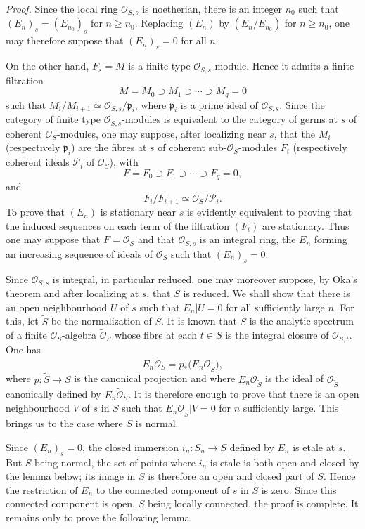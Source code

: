 \documentclass[11pt]{article}
\begin{document}
\emph{Proof.} Since the local ring $\mathcal O_{S,s}$ is noetherian, there is an integer $n_0$ such that $(E_n)_s=(E_{n_0})_s$ for $n\geq n_0$. Replacing $(E_n)$ by $(E_n/E_{n_0})$ for $n\geq n_0$, one may therefore suppose that $(E_n)_s=0$ for all $n$.

On the other hand, $F_s=M$ is a finite type $\mathcal O_{S,s}$-module. Hence it admits a finite filtration
\[
M=M_0\supset M_1\supset\cdots\supset M_q=0
\]
such that $M_i/M_{i+1}\simeq \mathcal O_{S,s}/\mathfrak p_i$, where $\mathfrak p_i$ is a prime ideal of $\mathcal O_{S,s}$. Since the category of finite type $\mathcal O_{S,s}$-modules is equivalent to the category of germs at $s$ of coherent $\mathcal O_S$-modules, one may suppose, after localizing near $s$, that the $M_i$ (respectively $\mathfrak p_i$) are the fibres at $s$ of coherent sub-$\mathcal O_S$-modules $F_i$ (respectively coherent ideals $\mathcal P_i$ of $\mathcal O_S$), with
\[
F=F_0\supset F_1\supset\cdots\supset F_q=0,
\]
and
\[
F_i/F_{i+1}\simeq \mathcal O_S/\mathcal P_i.
\]
To prove that $(E_n)$ is stationary near $s$ is evidently equivalent to proving that the induced sequences on each term of the filtration $(F_i)$ are stationary. Thus one may suppose that $F=\mathcal O_S$ and that $\mathcal O_{S,s}$ is an integral ring, the $E_n$ forming an increasing sequence of ideals of $\mathcal O_S$ such that $(E_n)_s=0$.

Since $\mathcal O_{S,s}$ is integral, in particular reduced, one may moreover suppose, by Oka's theorem and after localizing at $s$, that $S$ is reduced. We shall show that there is an open neighbourhood $U$ of $s$ such that $E_n|U=0$ for all sufficiently large $n$. For this, let $\widetilde S$ be the normalization of $S$. It is known that $S$ is the analytic spectrum of a finite $\mathcal O_S$-algebra $\widetilde{\mathcal O}_S$ whose fibre at each $t\in S$ is the integral closure of $\mathcal O_{S,t}$. One has
\[
E_n\widetilde{\mathcal O}_S
 =p_*\bigl(E_n\mathcal O_{\widetilde S}\bigr),
\]
where $p:\widetilde S\to S$ is the canonical projection and where $E_n\mathcal O_{\widetilde S}$ is the ideal of $\mathcal O_{\widetilde S}$ canonically defined by $E_n\widetilde{\mathcal O}_S$. It is therefore enough to prove that there is an open neighbourhood $V$ of $s$ in $\widetilde S$ such that $E_n\mathcal O_{\widetilde S}|V=0$ for $n$ sufficiently large. This brings us to the case where $S$ is normal.

Since $(E_n)_s=0$, the closed immersion $i_n:S_n\to S$ defined by $E_n$ is etale at $s$. But $S$ being normal, the set of points where $i_n$ is etale is both open and closed by the lemma below; its image in $S$ is therefore an open and closed part of $S$. Hence the restriction of $E_n$ to the connected component of $s$ in $S$ is zero. Since this connected component is open, $S$ being locally connected, the proof is complete. It remains only to prove the following lemma.
\end{document}
